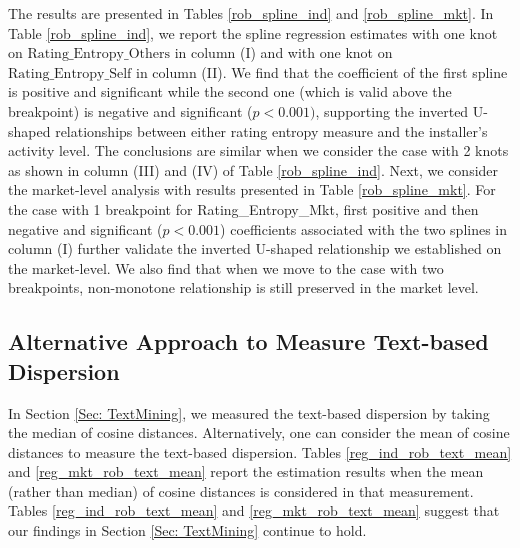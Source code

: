 \documentclass[msom,blindrev]{informs3}
\begin{document}
	
	The results are presented in Tables \ref{rob_spline_ind} and \ref{rob_spline_mkt}. In Table \ref{rob_spline_ind}, we report the spline regression estimates with one knot on $\text{Rating\_Entropy\_Others}$ in column (I) and with one knot on $\text{Rating\_Entropy\_Self}$ in column (II). We find that the coefficient of the first spline is positive and significant while the second one (which is valid above the breakpoint) is negative and significant ($p<0.001)$, supporting the inverted U-shaped relationships between either rating entropy measure and the installer's activity level. The conclusions are similar when we consider the case with 2 knots as shown in column (III) and (IV) of Table \ref{rob_spline_ind}.  Next, we consider the market-level analysis with results presented in Table \ref{rob_spline_mkt}. For the case with 1 breakpoint for Rating\_Entropy\_Mkt, first positive and then negative and significant ($p<0.001$) coefficients associated with the two splines in column (I) further validate the inverted U-shaped relationship we established on the market-level. We also find that when we move to the case with two breakpoints, non-monotone relationship is still preserved in the market level.
	
	
	
	\subsection{Alternative Approach to Measure Text-based Dispersion} \label{Sec: Mean}
	
	In Section \ref{Sec: TextMining}, we measured the text-based dispersion by taking the median of cosine distances. Alternatively, one can consider the mean of cosine distances to measure the text-based dispersion. Tables \ref{reg_ind_rob_text_mean} and \ref{reg_mkt_rob_text_mean} report the estimation results when the mean (rather than median) of cosine distances is considered in that measurement. Tables \ref{reg_ind_rob_text_mean} and \ref{reg_mkt_rob_text_mean} suggest that our findings in Section \ref{Sec: TextMining} continue to hold.
	
\end{document}
